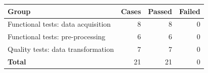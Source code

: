 \begin{tabular}{@{}lrrr@{}}
\toprule
\textbf{Group} & \textbf{Cases} & \textbf{Passed} & \textbf{Failed} \\
\midrule
Functional tests: data acquisition & 8 & 8 & 0 \\
Functional tests: pre-processing & 6 & 6 & 0 \\
Quality tests: data transformation & 7 & 7 & 0 \\
\midrule
\textbf{Total} & 21 & 21 & 0 \\
\bottomrule
\end{tabular}
